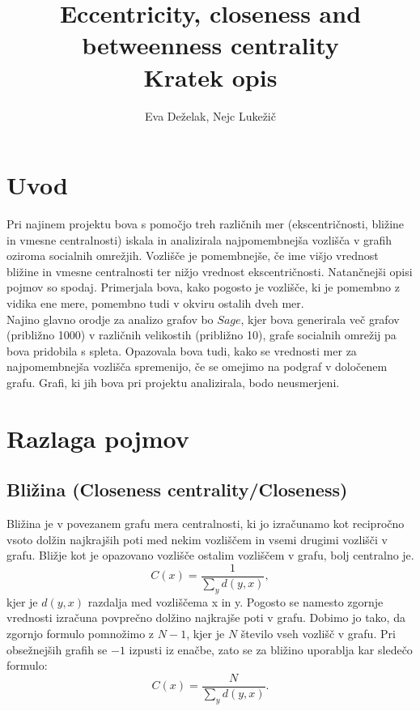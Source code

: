 \documentclass[12pt,a4paper]{amsart}
\begin{document}
\title{Eccentricity, closeness and betweenness centrality \\
\small Kratek opis}

\author{Eva Deželak, Nejc Lukežič}
\maketitle

\section{Uvod}
Pri najinem projektu bova s pomočjo treh različnih mer (ekscentričnosti, bližine in vmesne centralnosti) iskala in analizirala najpomembnejša vozlišča v grafih oziroma socialnih omrežjih. Vozlišče je pomembnejše, če ime višjo vrednost bližine in vmesne centralnosti ter nižjo vrednost ekscentričnosti. Natančnejši opisi pojmov so spodaj. Primerjala bova, kako pogosto je vozlišče, ki je pomembno z vidika ene mere, pomembno tudi v okviru ostalih dveh mer.\\
Najino glavno orodje za analizo grafov bo $Sage$, kjer bova generirala več grafov (približno 1000) v različnih velikostih (približno 10), grafe socialnih omrežij pa bova pridobila s spleta. Opazovala bova tudi, kako se vrednosti mer za najpomembnejša vozlišča spremenijo, če se omejimo na podgraf v določenem grafu. Grafi, ki jih bova pri projektu analizirala, bodo neusmerjeni.

\section{Razlaga pojmov}

\subsection{Bližina (Closeness centrality/Closeness)}

Bližina je v povezanem grafu mera centralnosti, ki jo izračunamo kot recipročno vsoto dolžin najkrajših poti med nekim vozliščem in vsemi drugimi vozlišči v grafu. Bližje kot je opazovano vozlišče ostalim vozliščem v grafu, bolj centralno je.
$$C(x) = \frac{1}{\sum_{y}^{} d(y,x)}, $$
kjer je $d(y, x)$ razdalja med vozliščema x in y. 
Pogosto se namesto zgornje vrednosti izračuna povprečno dolžino najkrajše poti v grafu. Dobimo jo tako, da zgornjo formulo pomnožimo z $N-1$, kjer je $N$ število vseh vozlišč v grafu. Pri obsežnejših grafih se $-1$ izpusti iz enačbe, zato se za bližino uporablja kar sledečo formulo:
$$C(x) = \frac{N}{\sum_{y}^{} d(y,x)}.$$
\end{document}
